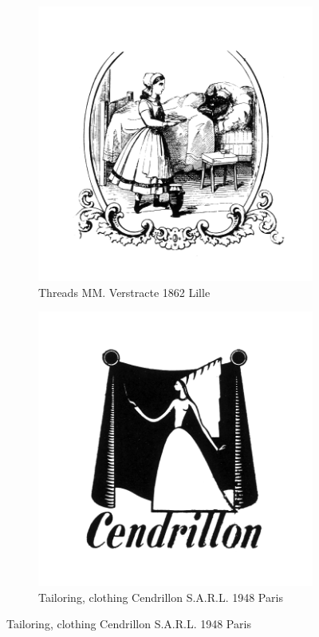 \begin{figure}[h]
  \begin{subfigure}{.45\textwidth}
    \centering
    \includegraphics[width=.5\linewidth]{images/supplement/trademarks/french/5_1}
    \caption{Threads MM. Verstracte 1862 Lille}
    \label{fig:trademarks:french:5.1}
  \end{subfigure}
  \begin{subfigure}{.45\textwidth}
    \centering
    \includegraphics[width=.5\linewidth]{images/supplement/trademarks/french/5_6}
    \caption{Tailoring, clothing Cendrillon S.A.R.L. 1948 Paris}
    \label{fig:trademarks:french:5.6}
  \end{subfigure}
\end{figure}

\clearpage

